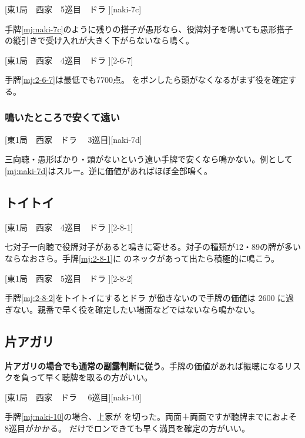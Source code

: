 \documentclass[10pt, twocolumn]{article}
\begin{document}
[東1局　西家　5巡目　ドラ ][naki-7c]

手牌\ref{mj:naki-7c}のように残りの搭子が愚形なら、役牌対子を鳴いても愚形搭子の縦引きで受け入れが大きく下がらないなら鳴く。

[東1局　西家　4巡目　ドラ ][2-6-7]

手牌\ref{mj:2-6-7}は最低でも7700点。 をポンしたら頭がなくなるがまず役を確定する\citep[][pp.~164--167]{tetsusenryaku}。

\subsubsection*{鳴いたところで安くて遠い} 

[東1局　西家　ドラ 　3巡目][naki-7d]

三向聴・愚形ばかり・頭がないという遠い手牌で安くなら鳴かない\citep[][p.~110]{hirasawa-naki}。例として\ref{mj:naki-7d}はスルー。逆に価値があればほぼ全部鳴く。


\subsection{トイトイ}

[東1局　西家　4巡目　ドラ ][2-8-1]

七対子一向聴で役牌対子があると鳴きに寄せる。対子の種類が12・89の牌が多いならなおさら。手牌\ref{mj:2-8-1}に  のネックがあって出たら積極的に鳴こう\citep[][pp.~204--211]{tetsusenryaku}。

[東1局　西家　5巡目　ドラ ][2-8-2]

手牌\ref{mj:2-8-2}をトイトイにするとドラ  が働きないので手牌の価値は 2600 に過ぎない。親番で早く役を確定したい場面などではないなら鳴かない。

\subsection{片アガリ}

\textbf{片アガリの場合でも通常の副露判断に従う}\citep[][p.~123]{hirasawa-naki}。手牌の価値があれば振聴になるリスクを負って早く聴牌を取るの方がいい。

[東1局　西家　ドラ 　6巡目][naki-10]

手牌\ref{mj:naki-10}の場合、上家が  を切った。両面＋両面ですが聴牌までにおよそ8巡目がかかる。 だけでロンできても早く満貫を確定の方がいい。
\end{document}
